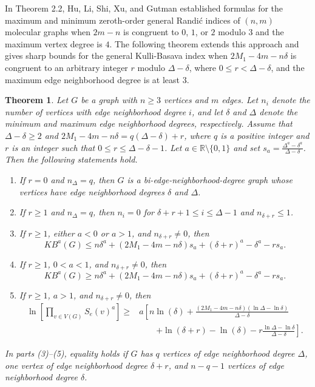 \documentclass[11pt, oneside]{amsart}   	%
\newtheorem{theorem}{Theorem}[section]
\theoremstyle{definition}
\theoremstyle{remark}
\numberwithin{equation}{section}
\begin{document}
In Theorem 2.2, Hu, Li, Shi, Xu, and Gutman \cite{hu2005molecular} established formulas for the maximum and minimum zeroth-order general Randi\'{c} indices of $(n,m)$ molecular graphs when $2m-n$ is congruent to $0$, $1$, or $2$ modulo $3$ and the maximum vertex degree is $4$. The following theorem extends this approach and gives sharp bounds for the general Kulli-Basava index when $2M_1-4m-n\delta$ is congruent to an arbitrary integer $r$ modulo $\Delta-\delta$, where $0\leq r<\Delta-\delta$, and the maximum edge neighborhood degree is at least $3$.

\begin{theorem}\label{Theorem3}
Let $G$ be a graph with $n\geq 3$ vertices and $m$ edges. Let $n_i$ denote the number of vertices with edge neighborhood degree $i$, and let $\delta$ and $\Delta$ denote the minimum and maximum edge neighborhood degrees, respectively. Assume that $\Delta-\delta\geq2$ and $2M_1-4m-n\delta=q(\Delta-\delta)+r$, where $q$ is a positive integer and $r$ is an integer such that $0\leq r\leq\Delta-\delta-1$. Let $a\in\mathbb{R}\setminus\{0,1\}$ and set $s_a=\frac{\Delta^a-\delta^a}{\Delta-\delta}$. Then the following statements hold.

 \begin{enumerate}
\item If $r=0$ and $n_\Delta=q$, then $G$ is a bi-edge-neighborhood-degree graph whose vertices have edge neighborhood degrees $\delta$ and $\Delta$.

  \item If $r \geq 1$ and $n_{\Delta} = q$, then $n_i = 0$ for $\delta + r + 1 \leq i \leq \Delta  - 1$ and $n_{\delta + r} \leq 1$.

\item If $r\geq1$, either $a<0$ or $a>1$, and $n_{\delta+r}\neq0$, then
\[
KB^a(G)\leq n\delta^a+(2M_1-4m-n\delta)s_a+(\delta+r)^a-\delta^a-rs_a.
\]

\item If $r\geq1$, $0<a<1$, and $n_{\delta+r}\neq0$, then
\[
KB^a(G)\geq n\delta^a+(2M_1-4m-n\delta)s_a+(\delta+r)^a-\delta^a-rs_a.
\]

\item If $r\geq1$, $a>1$, and $n_{\delta+r}\neq0$, then
\[
\begin{aligned}
\ln\left[\prod_{v\in V(G)}S_e(v)^a\right]\geq
&a\left[n\ln(\delta)+\frac{(2M_1-4m-n\delta)(\ln\Delta-\ln\delta)}{\Delta-\delta}\right.\\
&\qquad\left.+\ln(\delta+r)-\ln(\delta)-r\frac{\ln\Delta-\ln\delta}{\Delta-\delta}\right].
\end{aligned}
\]
 \end{enumerate}
In parts (3)--(5), equality holds if $G$ has $q$ vertices of edge neighborhood degree $\Delta$, one vertex of edge neighborhood degree $\delta+r$, and $n-q-1$ vertices of edge neighborhood degree $\delta$.
 
\end{theorem}
\end{document}

